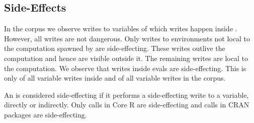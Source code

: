 \documentclass[conference]{IEEEtran}
\begin{document}

\subsection{Side-Effects}

In the corpus we observe \AllWritesRnd writes to variables of which
\EvalWritesRnd writes happen inside \eval. However, all writes are not
dangerous. Only writes to environments not local to the computation spawned
by \eval are side-effecting. These writes outlive the computation and hence are
visible outside it. The remaining writes are local to the
computation. We observe that \EvalSideEffectingWritesRnd writes inside evals are
side-effecting. This is only \EvalSideEffectingWritesEvalPerc of all variable
writes inside \eval and \EvalSideEffectingWritesAllPerc of all variable writes
in the corpus.

An \eval is considered side-effecting if it performs a side-effecting write to a
variable, directly or indirectly. Only \SideEffectingCoreCallPerc \eval calls in
Core R are side-effecting and \SideEffectingPackageCallPerc \eval calls in CRAN
packages are side-effecting.
\end{document}
